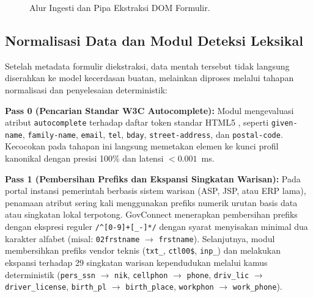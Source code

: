 \documentclass[conference]{IEEEtran}
\begin{document}
\begin{figure}[!htbp]
\centering
{}
\caption{Alur Ingesti dan Pipa Ekstraksi DOM Formulir.}
\label{fig:pipeline_ingestion}
\end{figure}

\subsection{Normalisasi Data dan Modul Deteksi Leksikal}
Setelah metadata formulir diekstraksi, data mentah tersebut tidak langsung diserahkan ke model kecerdasan buatan, melainkan diproses melalui tahapan normalisasi dan penyelesaian deterministik:

\textbf{Pass 0 (Pencarian Standar W3C Autocomplete):} Modul mengevaluasi atribut \texttt{autocomplete} terhadap daftar token standar HTML5 \cite{whatwg}, seperti \texttt{given-name}, \texttt{family-name}, \texttt{email}, \texttt{tel}, \texttt{bday}, \texttt{street-address}, dan \texttt{postal-code}. Kecocokan pada tahapan ini langsung memetakan elemen ke kunci profil kanonikal dengan presisi 100\% dan latensi $<0.001$~ms.

\textbf{Pass 1 (Pembersihan Prefiks dan Ekspansi Singkatan Warisan):} Pada portal instansi pemerintah berbasis sistem warisan (ASP, JSP, atau ERP lama), penamaan atribut sering kali menggunakan prefiks numerik urutan basis data atau singkatan lokal terpotong. GovConnect menerapkan pembersihan prefiks dengan ekspresi reguler \texttt{/\textasciicircum[0-9]+[\_-]*/} dengan syarat menyisakan minimal dua karakter alfabet (misal: \texttt{02frstname} $\to$ \texttt{frstname}). Selanjutnya, modul membersihkan prefiks vendor teknis (\texttt{txt\_}, \texttt{ctl00\$}, \texttt{inp\_}) dan melakukan ekspansi terhadap 29 singkatan warisan kependudukan melalui kamus deterministik (\texttt{pers\_ssn} $\to$ \texttt{nik}, \texttt{cellphon} $\to$ \texttt{phone}, \texttt{driv\_lic} $\to$ \texttt{driver\_license}, \texttt{birth\_pl} $\to$ \texttt{birth\_place}, \texttt{workphon} $\to$ \texttt{work\_phone}).
\end{document}
